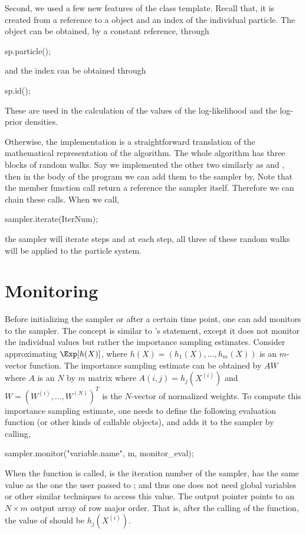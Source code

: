 Second, we used a few new features of the  class template. Recall that, it is created from a reference to a  object and an index of the individual particle. The  object can be obtained, by a constant reference, through
\begin{cppcode}
sp.particle();
\end{cppcode}
and the index can be obtained through
\begin{cppcode}
sp.id();
\end{cppcode}
These are used in the calculation of the values of the log-likelihood and the log-prior densities.

Otherwise, the implementation is a straightforward translation of the mathematical representation of the algorithm. The whole algorithm has three blocks of random walks. Say we implemented the other two similarly as  and , then in the body of the program we can add them to the sampler by,
Note that the  member function call return a reference the sampler itself. Therefore we can chain these calls. When we call,
\begin{cppcode}
sampler.iterate(IterNum);
\end{cppcode}
the sampler will iterate  steps and at each step, all three of these random walks will be applied to the particle system.

\section{Monitoring}
\label{sec:Monitoring}

Before initializing the sampler or after a certain time point, one can add monitors to the sampler. The concept is similar to \bugs's  statement, except it does not monitor the individual values but rather the importance sampling estimates. Consider approximating $\Exp[h(X)]$, where $h(X) = (h_1(X),\dots,h_m(X))$ is an $m$-vector function. The importance sampling estimate can be obtained by $AW$ where $A$ is an $N$ by $m$ matrix where $A(i,j) = h_j(X^{(i)})$ and $W = (W^{(i)},\dots,W^{(N)})^T$ is the $N$-vector of normalized weights. To compute this importance sampling estimate, one needs to define the following evaluation function (or other kinds of callable objects),
and adds it to the sampler by calling,
\begin{cppcode}
sampler.monitor("variable.name", m, monitor_eval);
\end{cppcode}
When the function  is called,  is the iteration number of the sampler,  has the same value as the one the user passed to ; and thus one does not need global variables or other similar techniques to access this value. The output pointer  points to an $N \times m$ output array of row major order. That is, after the calling of the function, the value of  should be $h_j(X^{(i)})$.


